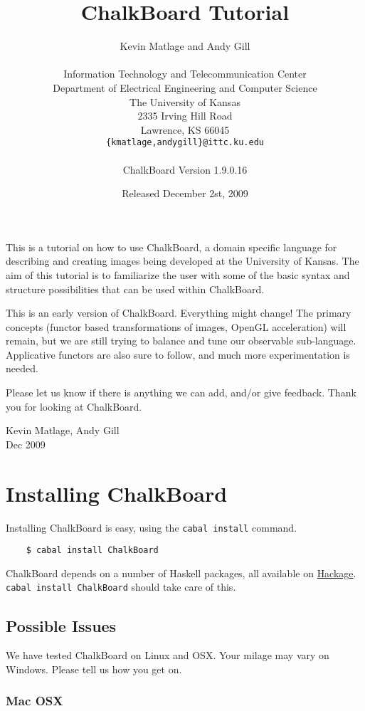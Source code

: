 \documentclass{article}
\title{ChalkBoard Tutorial}
\author{Kevin Matlage and Andy Gill\\
\\
Information Technology and Telecommunication Center\\
Department of Electrical Engineering and Computer Science\\
The University of Kansas\\
2335 Irving Hill Road\\
Lawrence, KS 66045\\
        \texttt{\{kmatlage,andygill\}@ittc.ku.edu}\\
\\
ChalkBoard Version 1.9.0.16
}
\date{Released December 2st, 2009}
\begin{document}
\maketitle

This is a tutorial on how to use ChalkBoard, a domain specific
language for describing and creating images being developed at the
University of Kansas. The aim of this tutorial is to familiarize the
user with some of the basic syntax and structure
possibilities that can be used within ChalkBoard.

This is an early version of ChalkBoard. Everything might change! The
primary concepts (functor based transformations of images, OpenGL acceleration) 
will remain, but we are still trying to balance and tune our observable sub-language.
Applicative functors are also sure to follow, and much more experimentation is needed.

Please let us know if there is anything we can add, and/or give feedback.
Thank you for looking at ChalkBoard.
\vskip 0.1in

Kevin Matlage, Andy Gill\\
Dec 2009

\newpage
\tableofcontents

\newpage
\listoffigures

\newpage
\section{Installing ChalkBoard}

Installing ChalkBoard is easy, using the \verb|cabal install| command.
\begin{verbatim}
    $ cabal install ChalkBoard
\end{verbatim}
ChalkBoard depends on a number of Haskell packages, all available on 
\href{http://hackage.haskell.org/}{Hackage}. \verb|cabal install ChalkBoard| should take care of this. 


\subsection{Possible Issues}

We have tested ChalkBoard on Linux and OSX. Your milage may vary on Windows. Please tell us how you get on.

\subsubsection{Mac OSX}
\end{document}

